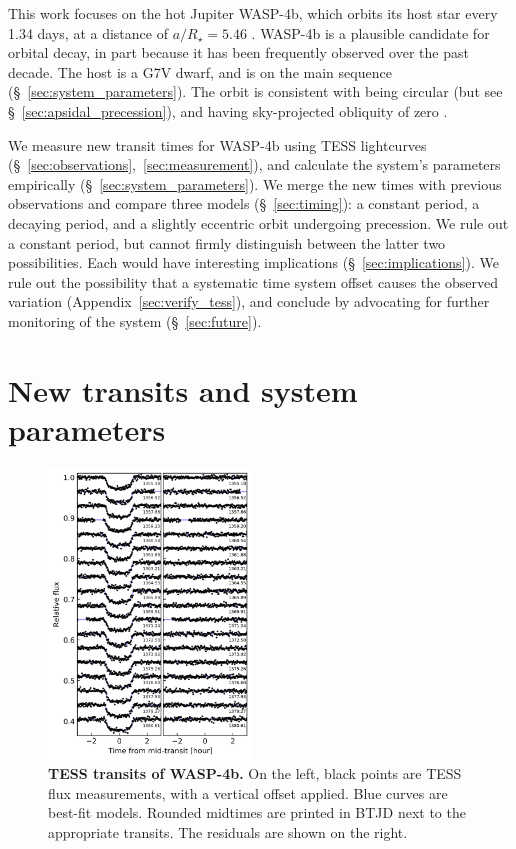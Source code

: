 \documentclass[12pt,twocolumn,tighten]{aastex62}
\begin{document}
This work focuses on the hot Jupiter WASP-4b, which orbits its host
star every 1.34 days, at a distance of $a/R_\star = 5.46$
\citep{wilson_wasp-4b_2008,hoyer_tramos_2013}.  WASP-4b is a plausible
candidate for orbital decay, in part because it has been frequently
observed over the past decade.  The host is a G7V dwarf, and is on the
main sequence (\S~\ref{sec:system_parameters}).  The orbit is
consistent with being circular (but see
\S~\ref{sec:apsidal_precession}), and having sky-projected obliquity
of zero
\citep{triaud_spin-orbit_2010,beerer_secondary_2011,sanchis-ojeda_starspots_2011}.

We measure new transit times for WASP-4b using TESS lightcurves
(\S~\ref{sec:observations},~\ref{sec:measurement}), and calculate the
system's parameters empirically (\S~\ref{sec:system_parameters}).  We
merge the new times with previous observations and compare three
models (\S~\ref{sec:timing}): a constant period, a decaying period,
and a slightly eccentric orbit undergoing precession.  We rule out a
constant period, but cannot firmly distinguish between the latter two
possibilities.  Each would have interesting implications
(\S~\ref{sec:implications}).  We rule out the possibility that a
systematic time system offset causes the observed variation
(Appendix~\ref{sec:verify_tess}), and conclude by advocating for
further monitoring of the system (\S~\ref{sec:future}).



\section{New transits and system parameters}
\begin{figure}[t]
    \begin{center}
        \includegraphics[width=0.48\textwidth]{f1.png}
    \end{center}
    \vspace{-0.5cm}
    \caption{
        {\bf TESS transits of WASP-4b.} On the left, black points are
        TESS flux measurements, with a vertical offset applied. Blue
        curves are best-fit models. Rounded midtimes are printed in
        BTJD next to the appropriate transits.  The residuals are
        shown on the right.
        \label{fig:lightcurves}
    }
\end{figure}
\end{document}
